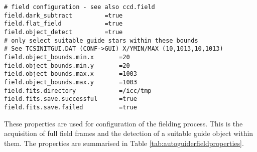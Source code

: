 \documentclass[10pt,a4paper]{article}
\begin{document}
\begin{verbatim}
# field configuration - see also ccd.field
field.dark_subtract			=true
field.flat_field			=true
field.object_detect			=true
# only select suitable guide stars within these bounds
# See TCSINITGUI.DAT (CONF->GUI) X/YMIN/MAX (10,1013,10,1013)
field.object_bounds.min.x		=20
field.object_bounds.min.y		=20
field.object_bounds.max.x		=1003
field.object_bounds.max.y		=1003
field.fits.directory			=/icc/tmp
field.fits.save.successful		=true
field.fits.save.failed			=true
\end{verbatim}

These properties are used for configuration of the fielding process. This is the acquisition of full field frames and the detection of a suitable guide object within them. The properties are summarised in Table \ref{tab:autoguiderfieldproperties}.
\end{document}
